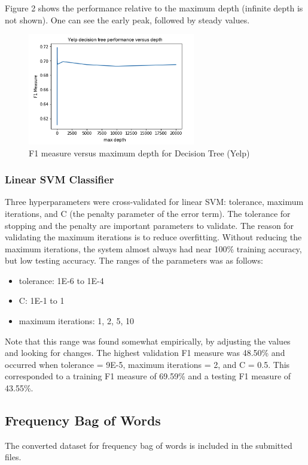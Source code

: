 \documentclass[11pt]{article}
\begin{document}
\noindent
Figure 2 shows the performance relative to the maximum depth (infinite depth is not shown). One can see the early peak, followed by steady values.

\begin{figure}[ht]
\centering
\includegraphics[width=0.65\textwidth]{Yelp_DT}
\caption{F1 measure versus maximum depth for Decision Tree (Yelp)}
\end{figure}

\subsubsection{Linear SVM Classifier}
Three hyperparameters were cross-validated for linear SVM: tolerance, maximum iterations, and C (the penalty parameter of the error term). The tolerance for stopping and the penalty are important parameters to validate. The reason for validating the maximum iterations is to reduce overfitting. Without reducing the maximum iterations, the system almost always had near 100\% training accuracy, but low testing accuracy. The ranges of the parameters was as follows:
\begin{itemize}
\item tolerance: 1E-6 to 1E-4
\item C: 1E-1 to 1
\item maximum iterations: {1, 2, 5, 10}
\end{itemize}
Note that this range was found somewhat empirically, by adjusting the values and looking for changes. The highest validation F1 measure was 48.50\% and occurred when tolerance = 9E-5, maximum iterations = 2, and C = 0.5. This corresponded to a training F1 measure of 69.59\% and a testing F1 measure of 43.55\%. 

\subsection{Frequency Bag of Words}
The converted dataset for frequency bag of words is included in the submitted files.
\end{document}
